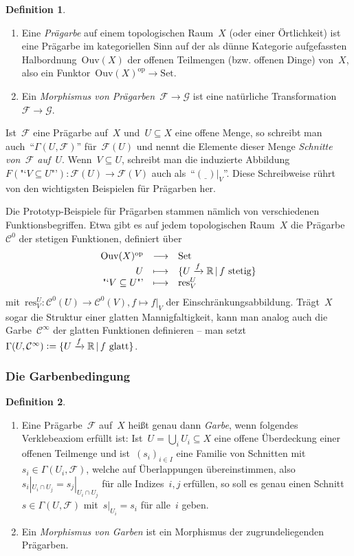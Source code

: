 \documentclass[a4paper,ngerman,12pt]{scrartcl}
\theoremstyle{definition}
\newtheorem{defn}{Definition}[section]
\theoremstyle{plain}
\theoremstyle{remark}
\newcommand{\xra}[1]{\xrightarrow{#1}}
\newcommand{\RR}{\mathbb{R}}
\newcommand{\C}{\mathcal{C}}
\newcommand{\F}{\mathcal{F}}
\newcommand{\G}{\mathcal{G}}
\newcommand{\Ouv}{\mathrm{Ouv}}
\newcommand{\res}{\mathrm{res}}
\newcommand{\freist}{\underline{\ \ }}
\newcommand{\op}{\mathrm{op}}
\newcommand{\Set}{\mathrm{Set}}
\renewcommand{\_}{\mathpunct{.}\,}
\newcommand{\?}{\,{:}\,}
\newcommand{\defeq}{\vcentcolon=}
\begin{document}
\begin{defn}\begin{enumerate}
\item Eine \emph{Prägarbe} auf einem topologischen Raum~$X$ (oder einer
Örtlichkeit) ist eine Prägarbe im kategoriellen Sinn auf der
als dünne Kategorie aufgefassten Halb\-ord\-nung~$\Ouv(X)$ der offenen
Teilmengen (bzw.  offenen Dinge) von~$X$, also ein Funktor~$\Ouv(X)^\op \to
\Set$.
\item Ein \emph{Morphismus von Prägarben}~$\F \to \G$ ist eine natürliche
Transformation~$\F \to \G$.
\end{enumerate}
\end{defn}

Ist~$\F$ eine Prägarbe auf~$X$ und~$U \subseteq X$ eine offene
Menge, so schreibt man auch~"`$\Gamma(U, \F)$"' für~$\F(U)$ und nennt die
Elemente dieser Menge \emph{Schnitte von~$\F$ auf~$U$}. Wenn~$V \subseteq U$,
schreibt man die induzierte Abbildung~$F(\text{"`$V \subseteq U$"'}) : \F(U)
\to \F(V)$ auch als~"`$(\freist)|_V$"'. Diese Schreibweise rührt von den
wichtigsten Beispielen für Prägarben her.

Die Prototyp-Beispiele für Prägarben stammen nämlich von verschiedenen
Funktionsbegriffen. Etwa gibt es auf jedem topologischen Raum~$X$ die
Prägarbe~$\C^0$ der stetigen Funktionen, definiert über
\[ \begin{array}{@{}rcl@{}}
  \Ouv(X)^\op &\longrightarrow& \Set \\
  U &\longmapsto& \{ U \xra{f} \RR \,|\, \text{$f$ stetig} \} \\
  \text{"`$V \subseteq U$"'} &\longmapsto& \res^U_V
\end{array} \]
mit~$\res^U_V : \C^0(U) \to \C^0(V), f \mapsto f|_V$ der
Einschränkungsabbildung.  Trägt~$X$ sogar die Struktur einer glatten
Mannigfaltigkeit, kann man analog auch die Garbe~$\C^\infty$ der glatten
Funktionen definieren -- man setzt $\Gamma(U, \C^\infty) \defeq \{ U \xra{f} \RR
\,|\, \text{$f$ glatt} \}$.


\subsubsection*{Die Garbenbedingung}

\begin{defn}\begin{enumerate}
\item Eine Prägarbe~$\F$ auf~$X$ heißt genau dann \emph{Garbe}, wenn
folgendes Verklebeaxiom erfüllt ist: Ist~$U = \bigcup_i U_i \subseteq X$ eine
offene Überdeckung einer offenen Teilmenge und ist~$(s_i)_{i \in I}$ eine
Familie von Schnitten mit~$s_i \in \Gamma(U_i, \F)$, welche auf Überlappungen
übereinstimmen, also
$s_i|_{U_i \cap U_j} = s_j|_{U_i \cap U_j}$
für alle Indizes~$i,j$ erfüllen, so soll es genau einen Schnitt~$s \in
\Gamma(U,\F)$ mit~$s|_{U_i} = s_i$ für alle~$i$ geben.
\item Ein \emph{Morphismus von Garben} ist ein Morphismus der zugrundeliegenden
Prägarben.
\end{enumerate}\end{defn}
\end{document}
